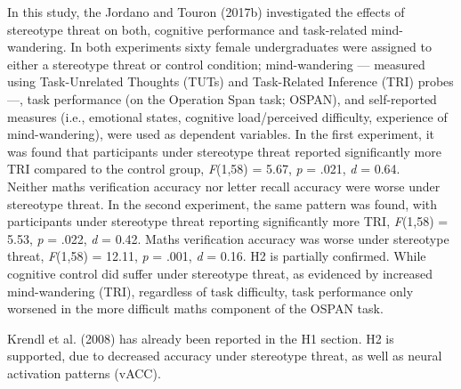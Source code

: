 \documentclass[
  stu, a4paper,floatsintext]{apa7}
\begin{document}
In this study, the Jordano and Touron (2017b) investigated the effects of stereotype threat on both, cognitive performance and task-related mind-wandering.
In both experiments sixty female undergraduates were assigned to either a stereotype threat or control condition; mind-wandering --- measured using Task-Unrelated Thoughts (TUTs) and Task-Related Inference (TRI) probes ---, task performance (on the Operation Span task; OSPAN), and self-reported measures (i.e., emotional states, cognitive load/perceived difficulty, experience of mind-wandering), were used as dependent variables.
In the first experiment, it was found that participants under stereotype threat reported significantly more TRI compared to the control group, \emph{F}(1,58) = 5.67, \emph{p} = .021, \emph{d} = 0.64.\\
Neither maths verification accuracy nor letter recall accuracy were worse under stereotype threat.
In the second experiment, the same pattern was found, with participants under stereotype threat reporting significantly more TRI, \emph{F}(1,58) = 5.53, \emph{p} = .022, \emph{d} = 0.42.
Maths verification accuracy was worse under stereotype threat, \emph{F}(1,58) = 12.11, \emph{p} = .001, \emph{d} = 0.16.
H2 is partially confirmed. While cognitive control did suffer under stereotype threat, as evidenced by increased mind-wandering (TRI), regardless of task difficulty, task performance only worsened in the more difficult maths component of the OSPAN task.

Krendl et al. (2008) has already been reported in the H1 section.
H2 is supported, due to decreased accuracy under stereotype threat, as well as neural activation patterns (vACC).
\end{document}
